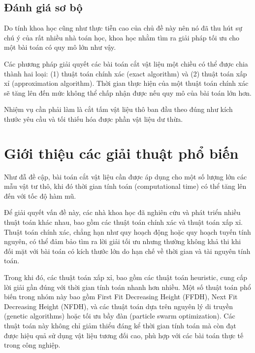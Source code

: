 \documentclass[a4paper]{article}
\begin{document}
\subsection{Đánh giá sơ bộ}
\hspace{11pt}
Do tính khoa học cũng như thực tiễn cao của chủ đề này nên nó đã thu hút sự chú ý của rất nhiều nhà toán học, khoa học nhằm tìm ra giải pháp tối ưu cho một bài toán có quy mô lớn như vậy. 

\hspace{11pt}
Các phương pháp giải quyết các bài toán cắt vật liệu một chiều có thể được chia thành hai loại: (1) thuật toán chính xác (exact algorithm) và (2) thuật toán xấp xỉ (approximation algorithm). Thời gian thực hiện của một thuật toán chính xác sẽ tăng lên đến mức không thể
chấp nhận được nếu quy mô của bài toán lớn hơn.

\hspace{11pt}
Nhiệm vụ cần phải làm là cắt tấm vật liệu thô ban đầu theo đúng như kích thước yêu cầu và tối thiếu hóa được phần vật liệu dư thừa.

\section{Giới thiệu các giải thuật phổ biến}
\hspace{11pt}
Như đẫ đề cập, bài toán cắt vật liệu cần được áp dụng cho một số lượng lớn các mẫu vật tư thô, khi đó thời gian tính toán (computational time) có thể tăng lên đến với tốc độ hàm mũ.

\hspace{11pt}
Để giải quyết vấn đề này, các nhà khoa học đã nghiên cứu và phát triển nhiều thuật toán khác nhau, bao gồm các thuật toán chính xác và thuật toán xấp xỉ. Thuật toán chính xác, chẳng hạn như quy hoạch động hoặc quy hoạch tuyến tính nguyên, có thể đảm bảo tìm ra lời giải tối ưu nhưng thường không khả thi khi đối mặt với bài toán có kích thước lớn do hạn chế về thời gian và tài nguyên tính toán.

\hspace{11pt}
Trong khi đó, các thuật toán xấp xỉ, bao gồm các thuật toán heuristic, cung cấp lời giải gần đúng với thời gian tính toán nhanh hơn nhiều. Một số thuật toán phổ biến trong nhóm này bao gồm First Fit Decreasing Height (FFDH), Next Fit Decreasing Height (NFDH), và các thuật toán dựa trên nguyên lý di truyền (genetic algorithms) hoặc tối ưu bầy đàn (particle swarm optimization). Các thuật toán này không chỉ giảm thiểu đáng kể thời gian tính toán mà còn đạt được hiệu quả sử dụng vật liệu tương đối cao, phù hợp với các bài toán thực tế trong công nghiệp.
\end{document}
